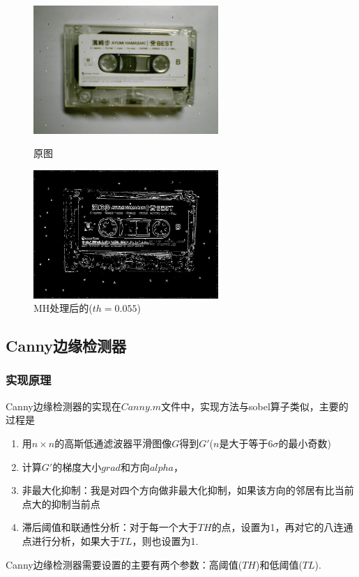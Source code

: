 \documentclass[11pt, a4paper, UTF8]{ctexart}
\begin{document}
\begin{figure}[H]
  \centering
  \begin{minipage}[t]{0.48\textwidth}
  \centering
  \includegraphics[width=7cm]{noise.jpg}
  \caption{原图}
  \end{minipage}
  \begin{minipage}[t]{0.48\textwidth}
  \centering
  \includegraphics[width=7cm]{MH_alpha=0.055_noise.png}
  \caption{MH处理后的($th=0.055$)}
  \end{minipage}
\end{figure}





\subsection{Canny边缘检测器}
\subsubsection{实现原理}
Canny边缘检测器的实现在$Canny.m$文件中，实现方法与sobel算子类似，主要的过程是
\begin{enumerate}
  \item 用$n \times n$的高斯低通滤波器平滑图像$G$得到$G'$($n$是大于等于$6\sigma$的最小奇数)
  \item 计算$G'$的梯度大小$grad$和方向$alpha$，
  \item 非最大化抑制：我是对四个方向做非最大化抑制，如果该方向的邻居有比当前点大的抑制当前点 
  \item 滞后阈值和联通性分析：对于每一个大于$TH$的点，设置为1，再对它的八连通点进行分析，如果大于$TL$，则也设置为1.
\end{enumerate}
Canny边缘检测器需要设置的主要有两个参数：高阈值($TH$)和低阈值($TL$).
\end{document}
